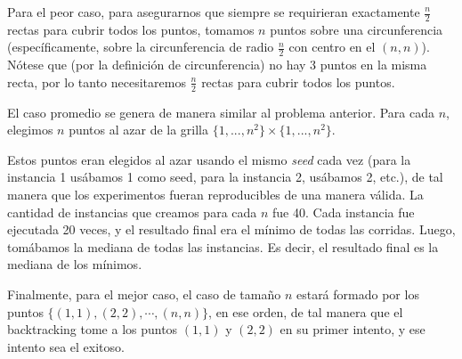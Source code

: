Para el peor caso, para asegurarnos que siempre se requirieran exactamente $\frac{n}{2}$ rectas para cubrir todos los puntos, tomamos $n$ puntos sobre una circunferencia (específicamente, sobre la circunferencia de radio $\frac{n}{2}$ con centro en el $(n,n)$). Nótese que (por la definición de circunferencia) no hay 3 puntos en la misma recta, por lo tanto necesitaremos $\frac{n}{2}$ rectas para cubrir todos los puntos.

El caso promedio se genera de manera similar al problema anterior. Para cada $n$, elegimos $n$ puntos al azar de la grilla $\{1,..., n^2\} \times \{1, ... , n^2\}$.

Estos puntos eran elegidos al azar usando el mismo \emph{seed} cada vez (para la instancia 1 usábamos 1 como seed, para la instancia 2, usábamos 2, etc.), de tal manera que los experimentos fueran reproducibles de una manera válida.
La cantidad de instancias que creamos para cada $n$ fue 40.
Cada instancia fue ejecutada 20 veces, y el resultado final era el mínimo de todas las corridas.
Luego, tomábamos la mediana de todas las instancias. Es decir, el resultado final es la mediana de los mínimos.

Finalmente, para el mejor caso, el caso de tamaño $n$ estará formado por los puntos $\{(1,1), (2,2), \cdots, (n, n)\}$, en ese orden, de tal manera que el backtracking tome a los puntos $(1,1)$ y $(2,2)$ en su primer intento, y ese intento sea el exitoso.
